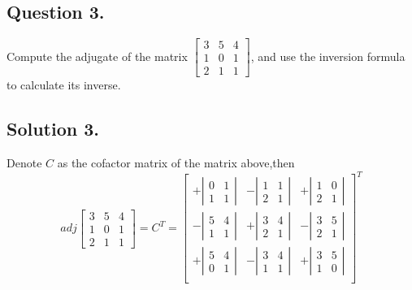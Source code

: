 \documentclass{article}
\begin{document}
\subsection*{Question 3.}
Compute the adjugate of the matrix $\left[\begin{array}{ccc}
3 & 5 & 4 \\1 & 0 & 1\\2 & 1 & 1\end{array}\right]$, and use the inversion formula to calculate its inverse.
\subsection*{Solution 3.}
Denote $C$ as the cofactor matrix of the matrix above,then
\[adj \left[\begin{array}{rrr}
3 & 5 & 4 \\1 & 0 & 1\\2 & 1 & 1\end{array}\right]=C^T=\left[\begin{array}{ccc}
+\left\vert\begin{array}{cc}0 & 1 \\ 1 & 1 \end{array}\right\vert &
-\left\vert\begin{array}{cc}1 & 1 \\ 2 & 1 \end{array}\right\vert &
+\left\vert\begin{array}{cc}1 & 0 \\ 2 & 1 \end{array}\right\vert \\
-\left\vert\begin{array}{cc}5 & 4 \\ 1 & 1 \end{array}\right\vert &
+\left\vert\begin{array}{cc}3 & 4 \\ 2 & 1 \end{array}\right\vert &
-\left\vert\begin{array}{cc}3 & 5 \\ 2 & 1 \end{array}\right\vert \\
+\left\vert\begin{array}{cc}5 & 4 \\ 0 & 1 \end{array}\right\vert &
-\left\vert\begin{array}{cc}3 & 4 \\ 1 & 1 \end{array}\right\vert &
+\left\vert\begin{array}{cc}3 & 5 \\ 1 & 0 \end{array}\right\vert \\
\end{array}\right]^T\]
\end{document}
